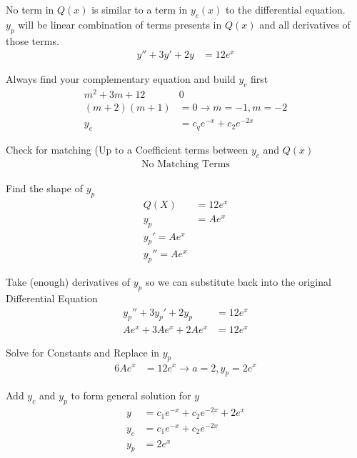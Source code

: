 \begin{case}
No term in $Q(x)$ is similar to a term in $y_c(x)$ to the differential equation.\\
$y_p$ will be linear combination of terms presents in $Q(x)$ and all derivatives of those terms.
\begin{align*}
    y''+3y'+2y&=12e^x
    \end{align*}
\begin{step} Always find your complementary equation and build $y_c$ first
    \begin{align*}
    m^2+3m+12&0\\
    (m+2)(m+1)&=0 \rightarrow m=-1, m=-2\\
    y_c&=c_qe^{-x}+c_2e^{-2x}
    \end{align*}
\end{step}
\begin{step} Check for matching (Up to a Coefficient terms between $y_c$ and $Q(x)$
    \begin{align*}
    \text{No Matching Terms}
    \end{align*}
\end{step}
\begin{step} Find the shape of $y_p$
    \begin{align*}
    Q(X)&=12e^x\\
    y_p&=Ae^x\\
    y_p'=Ae^x\\
    y_p''=Ae^x
    \end{align*}
\end{step}
\begin{step} Take (enough) derivatives of $y_p$ so we can substitute back into the original Differential Equation
    \begin{align*}
    y_p''+3y_p'+2y_p&=12e^x\\
    Ae^x+3Ae^x+2Ae^x&=12e^x
    \end{align*}
\end{step}
\begin{step} Solve for Constants and Replace in $y_p$
    \begin{align*}
    6Ae^x&= 12e^x \rightarrow a=2, y_p=2e^x
    \end{align*}
\end{step}
\begin{step} Add $y_c$ and $y_p$ to form general solution for $y$
    \begin{align*}
    y&= c_1e^{-x}+c_2e^{-2x}+2e^x\\
    y_c&=c_1e^{-x}+c_2e^{-2x}\\
    y_p&=2e^x
\end{align*}
\end{step}
\end{case}
